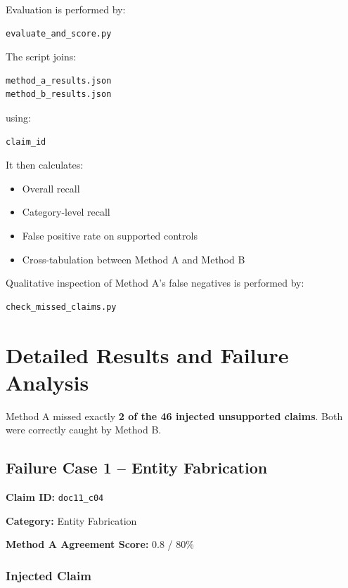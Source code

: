 \documentclass[11pt,a4paper]{article}
\begin{document}
Evaluation is performed by:

\begin{lstlisting}
evaluate_and_score.py
\end{lstlisting}

The script joins:

\begin{lstlisting}
method_a_results.json
method_b_results.json
\end{lstlisting}

using:

\begin{lstlisting}
claim_id
\end{lstlisting}

It then calculates:

\begin{itemize}
    \item Overall recall
    \item Category-level recall
    \item False positive rate on supported controls
    \item Cross-tabulation between Method A and Method B
\end{itemize}

Qualitative inspection of Method A's false negatives is performed by:

\begin{lstlisting}
check_missed_claims.py
\end{lstlisting}


\section{Detailed Results and Failure Analysis}

Method A missed exactly \textbf{2 of the 46 injected unsupported claims}. Both were correctly caught by Method B.

\subsection{Failure Case 1 -- Entity Fabrication}

\textbf{Claim ID:} \texttt{doc11\_c04}

\textbf{Category:} Entity Fabrication

\textbf{Method A Agreement Score:} 0.8 / 80\%

\subsubsection{Injected Claim}
\end{document}
